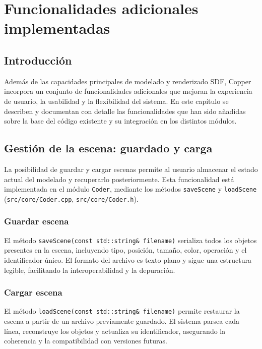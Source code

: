 \chapter{Funcionalidades adicionales implementadas}

\section{Introducción}

Además de las capacidades principales de modelado y renderizado SDF, Copper
incorpora un conjunto de funcionalidades adicionales que mejoran la experiencia
de usuario, la usabilidad y la flexibilidad del sistema. En este capítulo se
describen y documentan con detalle las funcionalidades que han sido añadidas
sobre la base del código existente y su integración en los distintos módulos.

\section{Gestión de la escena: guardado y carga}

La posibilidad de guardar y cargar escenas permite al usuario almacenar el
estado actual del modelado y recuperarlo posteriormente. Esta funcionalidad
está implementada en el módulo \texttt{Coder}, mediante los métodos
\texttt{saveScene} y \texttt{loadScene} (\texttt{src/core/Coder.cpp},
\texttt{src/core/Coder.h}).
\subsection{Guardar escena}

El método \texttt{saveScene(const std::string\& filename)} serializa todos los
objetos presentes en la escena, incluyendo tipo, posición, tamaño, color,
operación y el identificador único. El formato del archivo es texto plano y
sigue una estructura legible, facilitando la interoperabilidad y la depuración.

\subsection{Cargar escena}

El método \texttt{loadScene(const std::string\& filename)} permite restaurar la
escena a partir de un archivo previamente guardado. El sistema parsea cada
línea, reconstruye los objetos y actualiza su identificador, asegurando la
coherencia y la compatibilidad con versiones futuras.

